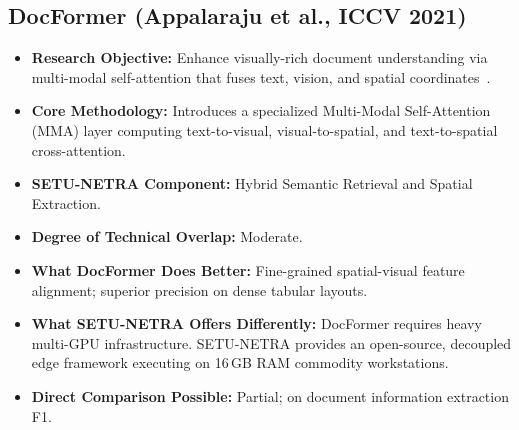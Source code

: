 \documentclass[11pt,a4paper]{article}
\begin{document}
\subsection{DocFormer (Appalaraju et al., ICCV 2021)}
\begin{itemize}[leftmargin=*]
    \item \textbf{Research Objective:} Enhance visually-rich document understanding via multi-modal self-attention that fuses text, vision, and spatial coordinates~\cite{Appalaraju2021DocFormer}.
    \item \textbf{Core Methodology:} Introduces a specialized Multi-Modal Self-Attention (MMA) layer computing text-to-visual, visual-to-spatial, and text-to-spatial cross-attention.
    \item \textbf{SETU-NETRA Component:} Hybrid Semantic Retrieval and Spatial Extraction.
    \item \textbf{Degree of Technical Overlap:} Moderate.
    \item \textbf{What DocFormer Does Better:} Fine-grained spatial-visual feature alignment; superior precision on dense tabular layouts.
    \item \textbf{What SETU-NETRA Offers Differently:} DocFormer requires heavy multi-GPU infrastructure. SETU-NETRA provides an open-source, decoupled edge framework executing on 16\,GB RAM commodity workstations.
    \item \textbf{Direct Comparison Possible:} Partial; on document information extraction F1.
\end{itemize}

\end{document}
